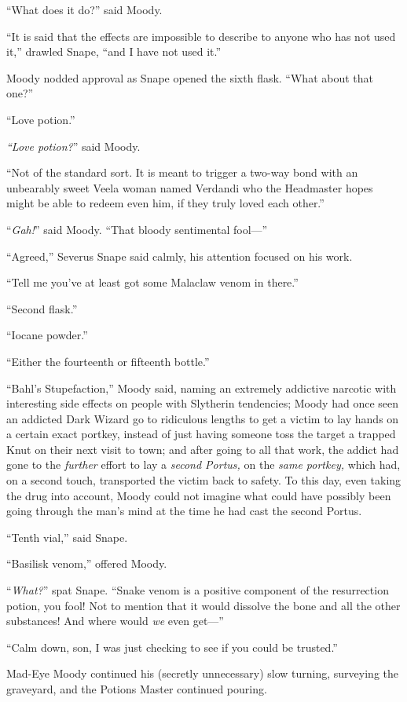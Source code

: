 “What does it do?” said Moody.

“It is said that the effects are impossible to describe to anyone who has not used it,” drawled Snape, “and I have not used it.”

Moody nodded approval as Snape opened the sixth flask. “What about that one?”

“Love potion.”

\emph{“Love potion?}” said Moody.

“Not of the standard sort. It is meant to trigger a two-way bond with an unbearably sweet Veela woman named Verdandi who the Headmaster hopes might be able to redeem even him, if they truly loved each other.”

“\emph{Gah!}” said Moody. “That bloody sentimental fool—”

“Agreed,” Severus Snape said calmly, his attention focused on his work.

“Tell me you’ve at least got some Malaclaw venom in there.”

“Second flask.”

“Iocane powder.”

“Either the fourteenth or fifteenth bottle.”

“Bahl’s Stupefaction,” Moody said, naming an extremely addictive narcotic with interesting side effects on people with Slytherin tendencies; Moody had once seen an addicted Dark Wizard go to ridiculous lengths to get a victim to lay hands on a certain exact portkey, instead of just having someone toss the target a trapped Knut on their next visit to town; and after going to all that work, the addict had gone to the \emph{further} effort to lay a \emph{second Portus,} on the \emph{same portkey,} which had, on a second touch, transported the victim back to safety. To this day, even taking the drug into account, Moody could not imagine what could have possibly been going through the man’s mind at the time he had cast the second Portus.

“Tenth vial,” said Snape.

“Basilisk venom,” offered Moody.

“\emph{What?}” spat Snape. “Snake venom is a positive component of the resurrection potion, you fool! Not to mention that it would dissolve the bone and all the other substances! And where would \emph{we} even get—”

“Calm down, son, I was just checking to see if you could be trusted.”

Mad-Eye Moody continued his (secretly unnecessary) slow turning, surveying the graveyard, and the Potions Master continued pouring.

